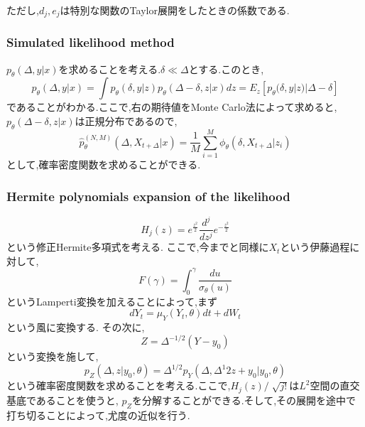 \documentclass[a4paper,dvipdfmx]{jreport}
\numberwithin{equation}{section}
\begin{document}
ただし,$d_j,e_j$は特別な関数のTaylor展開をしたときの係数である.

\subsubsection{Simulated likelihood method}
$p_\theta(\Delta,y|x)$を求めることを考える.$\delta \ll \Delta$とする.このとき,
\[
p_\theta(\Delta,y|x) = 
\int p_\theta(\delta,y|z)p_\theta(\Delta - \delta,z|x)dz 
= E_z[p_\theta(\delta,y|z)|\Delta-\delta]
\]
であることがわかる.ここで,右の期待値をMonte Carlo法によって求めると,
$p_\theta(\Delta - \delta,z|x)$は正規分布であるので,
\[
\hat{p}_\theta^{(N,M)}(\Delta,X_{t+\Delta}|x)
= \frac{1}{M}\sum_{i=1}^M \phi_\theta(\delta,X_{t+\Delta}|z_i)
\]
として,確率密度関数を求めることができる.

\subsubsection{Hermite polynomials expansion of the likelihood}

\[
H_j(z) = e^{\frac{z^2}{2}} \frac{d^j}{dz^j} e^{-\frac{z^2}{2}} 
\]
という修正Hermite多項式を考える.
ここで,今までと同様に$X_t$という伊藤過程に対して,
\[
F(\gamma) = \int_0^\gamma \frac{du}{\sigma_\theta(u)}
\]
というLamperti変換を加えることによって,まず
\[
dY_t = \mu_Y(Y_t,\theta)dt + dW_t
\]
という風に変換する.
その次に,
\[
Z = \Delta^{-1/2} (Y-y_0)
\]
という変換を施して,
\[
p_Z(\Delta,z|y_0,\theta) = \Delta^{1/2} p_Y(\Delta,\Delta^{1}{2}z+y_0|y_0,\theta)
\]
という確率密度関数を求めることを考える.ここで,$H_j(z)/\sqrt[]{j!}$は$L^2$空間の直交基底であることを使うと,
$p_Z$を分解することができる.そして,その展開を途中で打ち切ることによって,尤度の近似を行う.
\end{document}
